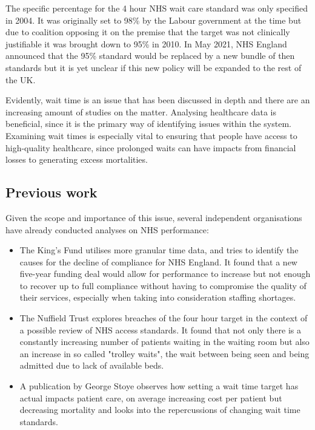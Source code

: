 \documentclass[12pt,a4paper]{article}
\begin{document}
The specific percentage for the 4 hour NHS wait care standard was only specified in 2004. It was originally set to 98\% by the Labour government at the time but due to coalition opposing it on the premise that the target was not clinically justifiable it was brought down to 95\% in 2010.\cite{the_guardian_2013} In May 2021, NHS England announced that the 95\% standard would be replaced by a new bundle of then standards but it is yet unclear if this new policy will be expanded to the rest of the UK.

Evidently, wait time is an issue that has been discussed in depth and there are an increasing amount of studies on the matter. Analysing healthcare data is beneficial, since it is the primary way of identifying issues within the system. Examining wait times is especially vital to ensuring that people have access to high-quality healthcare, since prolonged waits can have impacts from financial losses to generating excess mortalities.\cite{iacobucci_2021}

\subsection{Previous work} 

Given the scope and importance of this issue, several independent organisations have already conducted analyses on NHS performance:
\begin{itemize} 
    \item The King's Fund utilises more granular time data, and tries to identify the causes for the decline of compliance for NHS England. It found that a new five-year funding deal would allow for performance to increase but not enough to recover up to full compliance without having to compromise the quality of their services, especially when taking into consideration staffing shortages.\cite{the_kings_fund_2020}
    \item The Nuffield Trust explores breaches of the four hour target in the context of a possible review of NHS access standards. It found that not only there is a constantly increasing number of patients waiting  in the waiting room but also an increase in so called "trolley waits", the wait between being seen and being admitted due to lack of available beds.\cite{the_nuffield_trust_2022}
    \item A publication by George Stoye observes how setting a wait time target has actual impacts patient care, on average increasing cost per patient but decreasing mortality and looks into the repercussions of changing wait time standards.\cite{stoye_2020}
\end{itemize}
\end{document}

